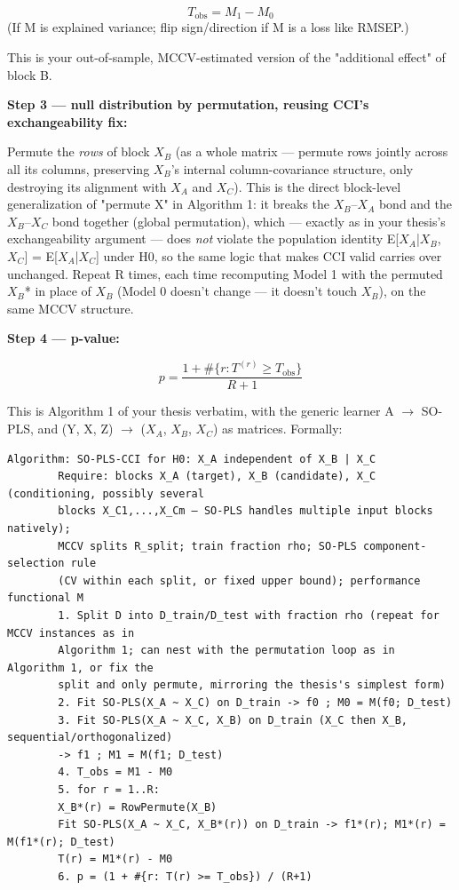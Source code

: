 \documentclass[11pt,a4paper]{article}
\begin{document}
	\[
	T_{\mathrm{obs}}=M_1-M_0
	\]
	(If M is explained variance; flip sign/direction if M is a loss like RMSEP.)
	
	This is your out-of-sample, MCCV-estimated version of the "additional effect" of block B.
	
	\textbf{Step 3 — null distribution by permutation, reusing CCI's exchangeability fix:}
	
	Permute the \emph{rows} of block \(X_B\) (as a whole matrix — permute rows jointly across all its columns, preserving \(X_B\)'s internal column-covariance structure, only destroying its alignment with \(X_A\) and \(X_C\)). This is the direct block-level generalization of "permute X" in Algorithm 1: it breaks the \(X_B\)–\(X_A\) bond and the \(X_B\)–\(X_C\) bond together (global permutation), which — exactly as in your thesis's exchangeability argument — does \emph{not} violate the population identity E[\(X_A\)|\(X_B\),\(X_C\)] = E[\(X_A\)|\(X_C\)] under H0, so the same logic that makes CCI valid carries over unchanged. Repeat R times, each time recomputing Model 1 with the permuted \(X_B\)* in place of \(X_B\) (Model 0 doesn't change — it doesn't touch \(X_B\)), on the same MCCV structure.
	
	\textbf{Step 4 — p-value:}
	
	\[
	p=\frac{1+\#\{r:T^{(r)}\geq T_{\mathrm{obs}}\}}{R+1}
	\]
	
	This is Algorithm 1 of your thesis verbatim, with the generic learner A \(\rightarrow\) SO-PLS, and (Y, X, Z) \(\rightarrow\) (\(X_A\), \(X_B\), \(X_C\)) as matrices. Formally:
	
	\begin{Verbatim}[fontsize=\scriptsize]
		Algorithm: SO-PLS-CCI for H0: X_A independent of X_B | X_C
		Require: blocks X_A (target), X_B (candidate), X_C (conditioning, possibly several
		blocks X_C1,...,X_Cm — SO-PLS handles multiple input blocks natively);
		MCCV splits R_split; train fraction rho; SO-PLS component-selection rule
		(CV within each split, or fixed upper bound); performance functional M
		1. Split D into D_train/D_test with fraction rho (repeat for MCCV instances as in
		Algorithm 1; can nest with the permutation loop as in Algorithm 1, or fix the
		split and only permute, mirroring the thesis's simplest form)
		2. Fit SO-PLS(X_A ~ X_C) on D_train -> f0 ; M0 = M(f0; D_test)
		3. Fit SO-PLS(X_A ~ X_C, X_B) on D_train (X_C then X_B, sequential/orthogonalized)
		-> f1 ; M1 = M(f1; D_test)
		4. T_obs = M1 - M0
		5. for r = 1..R:
		X_B*(r) = RowPermute(X_B)
		Fit SO-PLS(X_A ~ X_C, X_B*(r)) on D_train -> f1*(r); M1*(r) = M(f1*(r); D_test)
		T(r) = M1*(r) - M0
		6. p = (1 + #{r: T(r) >= T_obs}) / (R+1)
	\end{Verbatim}
	
\end{document}
